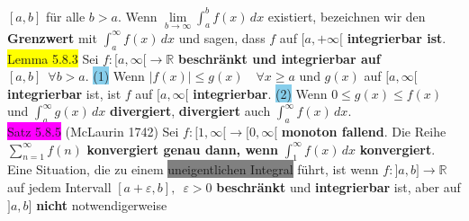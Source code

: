 \documentclass[landscape, 10pt]{article}
\newcommand{\R}{\mathbb{R}}
\begin{document}
\begin{multicols}{3}
                     \textcolor{NavyBlue}{$[a,b]$} für alle 
                     \textcolor{NavyBlue}{$b>a$}. 
                     Wenn \textcolor{NavyBlue}{
                     $\lim\limits_{b\to\infty}\int_a^bf(x)\,dx$} 
                     existiert, bezeichnen wir den \textbf{Grenzwert} mit 
                     \textcolor{NavyBlue}{$\int_a^\infty f(x)\,dx$} 
                     und sagen, dass \textcolor{NavyBlue}{$f$} auf 
                     \textcolor{NavyBlue}{$[a,+\infty[$} 
                     \textbf{integrierbar ist}.\\
              \colorbox{yellow}{Lemma 5.8.3} 
                     Sei \textcolor{NavyBlue}{$f:[a,\infty[\longrightarrow\R$} 
                     \textbf{beschränkt und integrierbar auf} 
                     \textcolor{NavyBlue}{$[a,b]\enspace\forall b>a$}. 
                     \colorbox{SkyBlue}{(1)} Wenn 
                     \textcolor{NavyBlue}{$|f(x)|\leqslant g(x)\quad\forall x\geqslant a$}
                     und \textcolor{NavyBlue}{$g(x)$} auf \textcolor{NavyBlue}{$[a,\infty[$} 
                     \textbf{integrierbar} ist, ist 
                     \textcolor{NavyBlue}{$f$} auf \textcolor{NavyBlue}{$[a,\infty[$}
                     \textbf{integrierbar}. 
                     \colorbox{SkyBlue}{(2)} Wenn 
                     \textcolor{NavyBlue}{$0\leqslant g(x)\leqslant f(x)$} 
                     und \textcolor{NavyBlue}{$\int_a^\infty g(x)\,dx$} 
                     \textbf{divergiert}, \textbf{divergiert} auch 
                     \textcolor{NavyBlue}{$\int_a^\infty f(x)\,dx$}.\\
              \colorbox{magenta}{Satz 5.8.5} (McLaurin 1742) Sei 
                     \textcolor{NavyBlue}{$f:[1,\infty[\longrightarrow[0,\infty[$} 
                     \textbf{monoton fallend}. Die Reihe 
                     \textcolor{NavyBlue}{$\sum_{n=1}^\infty f(n)$} 
                     \textbf{konvergiert genau dann, wenn} 
                     \textcolor{NavyBlue}{$\int_1^\infty f(x)\,dx$} 
                     \textbf{konvergiert}. \\
              Eine Situation, die zu einem 
                     \colorbox{gray}{uneigentlichen Integral} führt, 
                     ist wenn \textcolor{NavyBlue}{$f:]a,b]\longrightarrow\R$} 
                     auf jedem Intervall 
                     \textcolor{NavyBlue}{$[a+\varepsilon,b],\enspace\varepsilon>0$} 
                     \textbf{beschränkt} und \textbf{integrierbar} ist, aber auf 
                     \textcolor{NavyBlue}{$]a,b]$} \textbf{nicht} notwendigerweise 

\end{multicols}
\end{document}
